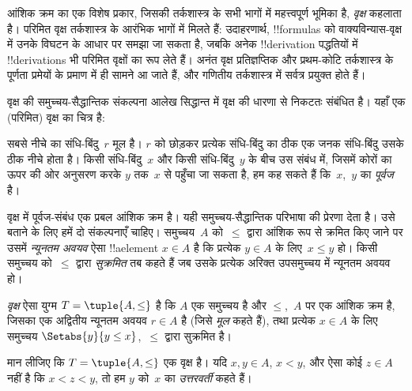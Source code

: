\documentclass[../../../include/open-logic-section]{subfiles}
\begin{document}

आंशिक क्रम का एक विशेष प्रकार, जिसकी तर्कशास्त्र के सभी भागों में महत्त्वपूर्ण
भूमिका है, \emph{वृक्ष} कहलाता है। परिमित वृक्ष तर्कशास्त्र के आरंभिक भागों
में मिलते हैं: उदाहरणार्थ, !!{formula}s को वाक्यविन्यास-वृक्ष में उनके विघटन
के आधार पर समझा जा सकता है, जबकि अनेक !!{derivation} पद्धतियों में
!!{derivation}s भी परिमित वृक्षों का रूप लेते हैं।
%
अनंत वृक्ष प्रतिज्ञप्तिक और प्रथम-कोटि तर्कशास्त्र के पूर्णता प्रमेयों के
प्रमाण में ही सामने आ जाते हैं, और गणितीय तर्कशास्त्र में सर्वत्र प्रयुक्त
होते हैं।

वृक्ष की समुच्चय-सैद्धान्तिक संकल्पना आलेख सिद्धान्त में वृक्ष की धारणा से
निकटतः संबंधित है। यहाँ एक (परिमित) वृक्ष का चित्र है:

\begin{center}
\end{center}

सबसे नीचे का संधि-बिंदु~$r$ मूल है। $r$ को छोड़कर प्रत्येक संधि-बिंदु का ठीक
एक जनक संधि-बिंदु उसके ठीक नीचे होता है। किसी संधि-बिंदु~$x$ और किसी
संधि-बिंदु~$y$ के बीच उस संबंध में, जिसमें कोरों का ऊपर की ओर अनुसरण करके
$y$ तक~$x$ से पहुँचा जा सकता है, हम कह सकते हैं कि~$x$,~$y$ का
\emph{पूर्वज} है।

वृक्ष में पूर्वज-संबंध एक प्रबल आंशिक क्रम है। यही समुच्चय-सैद्धान्तिक
परिभाषा की प्रेरणा देता है। उसे बताने के लिए हमें दो संकल्पनाएँ चाहिए।
समुच्चय~$A$ को~$\le$ द्वारा आंशिक रूप से क्रमित किए जाने पर उसमें
\emph{न्यूनतम अवयव} ऐसा !!a{element} $x \in A$ है कि प्रत्येक $y \in A$
के लिए~$x \le y$ हो। किसी समुच्चय को~$\le$ द्वारा \emph{सुक्रमित} तब कहते
हैं जब उसके प्रत्येक अरिक्त उपसमुच्चय में न्यूनतम अवयव हो।

\begin{defn}[वृक्ष]
\emph{वृक्ष} ऐसा युग्म $T = \tuple{A, \le}$ है कि $A$ एक समुच्चय है और
$\le$,~$A$ पर एक आंशिक क्रम है, जिसका एक अद्वितीय न्यूनतम अवयव
$r \in A$ है (जिसे \emph{मूल} कहते हैं), तथा प्रत्येक $x \in A$ के लिए
समुच्चय $\Setabs{y}{y \le x}$,~$\le$ द्वारा सुक्रमित है।
\end{defn}

\begin{defn}[उत्तरवर्ती]
मान लीजिए कि $T = \tuple{A, \le}$ एक वृक्ष है।
यदि $x,y \in A$, $x < y$, और ऐसा कोई $z \in A$ नहीं है कि
$x < z < y$, तो हम $y$ को~$x$ का \emph{उत्तरवर्ती} कहते हैं।
\end{defn}
\end{document}
